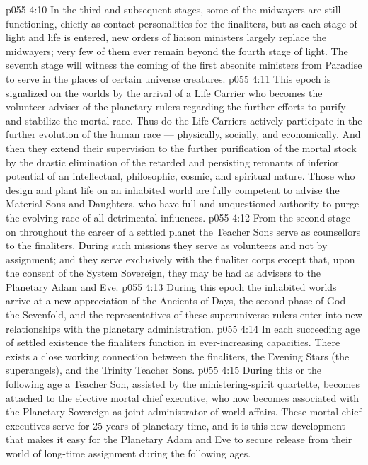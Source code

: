 \vs p055 4:10 In the third and subsequent stages, some of the midwayers are still functioning, chiefly as contact personalities for the finaliters, but as each stage of light and life is entered, new orders of liaison ministers largely replace the midwayers; very few of them ever remain beyond the fourth stage of light. The seventh stage will witness the coming of the first absonite ministers from Paradise to serve in the places of certain universe creatures.
\vs p055 4:11 \bibnobreakspace {} This epoch is signalized on the worlds by the arrival of a Life Carrier who becomes the volunteer adviser of the planetary rulers regarding the further efforts to purify and stabilize the mortal race. Thus do the Life Carriers actively participate in the further evolution of the human race --- physically, socially, and economically. And then they extend their supervision to the further purification of the mortal stock by the drastic elimination of the retarded and persisting remnants of inferior potential of an intellectual, philosophic, cosmic, and spiritual nature. Those who design and plant life on an inhabited world are fully competent to advise the Material Sons and Daughters, who have full and unquestioned authority to purge the evolving race of all detrimental influences.
\vs p055 4:12 From the second stage on throughout the career of a settled planet the Teacher Sons serve as counsellors to the finaliters. During such missions they serve as volunteers and not by assignment; and they serve exclusively with the finaliter corps except that, upon the consent of the System Sovereign, they may be had as advisers to the Planetary Adam and Eve.
\vs p055 4:13 \bibnobreakspace {} During this epoch the inhabited worlds arrive at a new appreciation of the Ancients of Days, the second phase of God the Sevenfold, and the representatives of these superuniverse rulers enter into new relationships with the planetary administration.
\vs p055 4:14 In each succeeding age of settled existence the finaliters function in ever\hyp{}increasing capacities. There exists a close working connection between the finaliters, the Evening Stars (the superangels), and the Trinity Teacher Sons.
\vs p055 4:15 During this or the following age a Teacher Son, assisted by the ministering\hyp{}spirit quartette, becomes attached to the elective mortal chief executive, who now becomes associated with the Planetary Sovereign as joint administrator of world affairs. These mortal chief executives serve for 25 years of planetary time, and it is this new development that makes it easy for the Planetary Adam and Eve to secure release from their world of long\hyp{}time assignment during the following ages.
